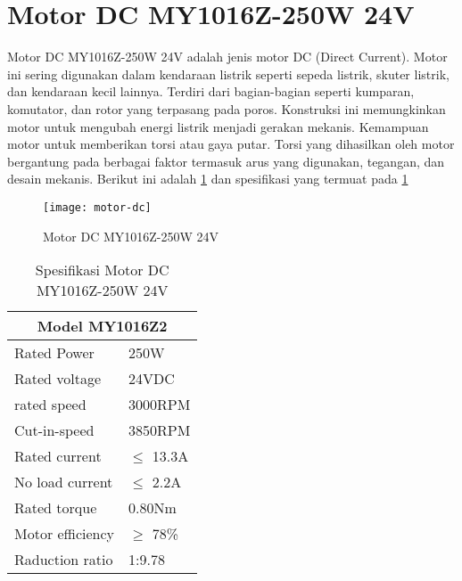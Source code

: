 \section{Motor DC MY1016Z-250W 24V}
Motor DC MY1016Z-250W 24V adalah jenis motor DC (Direct Current). Motor ini sering digunakan dalam kendaraan listrik seperti sepeda listrik, skuter listrik, dan kendaraan kecil lainnya. Terdiri dari bagian-bagian seperti kumparan, komutator, dan rotor yang terpasang pada poros. Konstruksi ini memungkinkan motor untuk mengubah energi listrik menjadi gerakan mekanis. Kemampuan motor untuk memberikan torsi atau gaya putar. Torsi yang dihasilkan oleh motor bergantung pada berbagai faktor termasuk arus yang digunakan, tegangan, dan desain mekanis. Berikut ini adalah \cref{fig:motordc} dan spesifikasi yang termuat pada \cref{tab:spesifikasi-motor}

\begin{figure}[H]
	\centering
	\texttt{[image: motor-dc]}
	\caption{Motor DC MY1016Z-250W 24V}
	\label{fig:motordc}
\end{figure}

\begin{table}[H]
	\caption{Spesifikasi Motor DC MY1016Z-250W 24V}
	\label{tab:spesifikasi-motor}
	\centering
	\begin{tabular}{|ll|}
		\hline
		\multicolumn{2}{|c|}{Model  MY1016Z2}            \\ \hline
		\multicolumn{1}{|l|}{Rated Power}      & 250W    \\ \hline
		\multicolumn{1}{|l|}{Rated voltage}    & 24VDC   \\ \hline
		\multicolumn{1}{|l|}{rated speed}      & 3000RPM \\ \hline
		\multicolumn{1}{|l|}{Cut-in-speed}     & 3850RPM \\ \hline
		\multicolumn{1}{|l|}{Rated current}    & $\leq$ 13.3A \\ \hline
		\multicolumn{1}{|l|}{No load current}  & $\leq$ 2.2A  \\ \hline
		\multicolumn{1}{|l|}{Rated torque}     & 0.80Nm  \\ \hline
		\multicolumn{1}{|l|}{Motor efficiency} & $\geq$ 78\%  \\ \hline
		\multicolumn{1}{|l|}{Raduction ratio}  & 1:9.78  \\ \hline
	\end{tabular}
\end{table}
